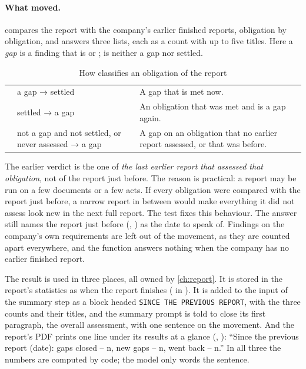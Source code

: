 \paragraph{What moved.}  compares the report with the company's earlier
finished reports, obligation by obligation, and answers three lists, each as a count with up
to five titles. Here a \emph{gap} is a finding that is  or ;
 is neither a gap nor settled.

\begin{table}[H]
\caption{How  classifies an obligation of the report}\label{tab:register:changes}
\begin{tabularx}{\textwidth}{@{}L{20mm}L{44mm}Y@{}}
\toprule
{} &  &  \\
\midrule
{} & a gap → settled & A gap that is met now. \\
 & settled → a gap & An obligation that was met and is a gap again. \\
 & not a gap and not settled, or never assessed → a gap & A gap on an obligation
  that no earlier report assessed, or that was  before. \\
\bottomrule
\end{tabularx}
\end{table}

The earlier verdict is the one of \emph{the last earlier report that assessed that
obligation}, not of the report just before. The reason is practical: a report may be run on a
few documents or a few acts. If every obligation were compared with the report just before,
a narrow report in between would make everything it did not assess look new in the next full
report. The test  fixes
this behaviour. The answer still names the report just before (, )
as the date to speak of. Findings on the company's own requirements are left out of the
movement, as they are counted apart everywhere, and the function answers nothing when the
company has no earlier finished report.

The result is used in three places, all owned by \cref{ch:report}. It is stored in the
report's statistics as  when the report finishes ( in
). It is added to the input of the summary step as a block headed
\texttt{SINCE THE PREVIOUS REPORT}, with the three counts and their titles, and the summary
prompt is told to close its first paragraph, the overall assessment, with one sentence on the
movement. And the
report's PDF prints one line under its results at a glance (,
): \enquote{Since the previous report (date): gaps closed -- n, new gaps -- n,
went back -- n.} In all three the numbers are computed by code; the model only words the
sentence.



